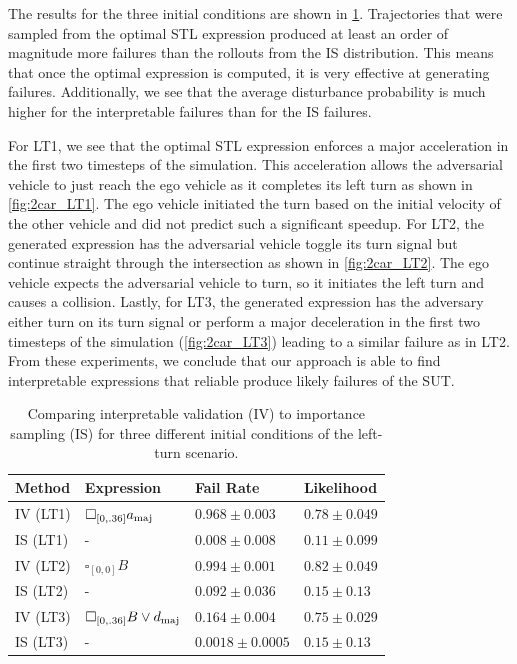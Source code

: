 The results for the three initial conditions are shown in \cref{tab:2car_results}. Trajectories that were sampled from the optimal STL expression produced at least an order of magnitude more failures than the rollouts from the IS distribution. This means that once the optimal expression is computed, it is very effective at generating failures. Additionally, we see that the average disturbance probability is much higher for the interpretable failures than for the IS failures. 

For LT1, we see that the optimal STL expression enforces a major acceleration in the first two timesteps of the simulation. This acceleration allows the adversarial vehicle to just reach the ego vehicle as it completes its left turn as shown in \cref{fig:2car_LT1}. The ego vehicle initiated the turn based on the initial velocity of the other vehicle and did not predict such a significant speedup. For LT2, the generated expression has the adversarial vehicle toggle its turn signal but continue straight through the intersection as shown in \cref{fig:2car_LT2}. The ego vehicle expects the adversarial vehicle to turn, so it initiates the left turn and causes a collision. Lastly, for LT3, the generated expression has the adversary either turn on its turn signal or perform a major deceleration in the first two timesteps of the simulation (\cref{fig:2car_LT3}) leading to a similar failure as in LT2. From these experiments, we conclude that our approach is able to find interpretable expressions that reliable produce likely failures of the SUT.

\begin{table}
    \centering
    \caption{Comparing interpretable validation (IV) to importance sampling (IS) for three different initial conditions of the left-turn scenario.}
    \label{tab:2car_results}
    \begin{tabular}{@{}llll@{}} 
        \toprule
        \textbf{Method} & \textbf{Expression} & \textbf{Fail Rate} & \textbf{Likelihood} \\
        \midrule
        IV (LT1) & $\square_{[0, .36]} a_{\rm maj}$ & $0.968 \pm 0.003$ & $0.78 \pm 0.049$ \\
        IS (LT1) & - &$0.008 \pm 0.008$ & $0.11 \pm 0.099$ \\
        \midrule
        IV (LT2) & $\square_{[0, 0]} B$ & $0.994 \pm 0.001$ & $0.82 \pm 0.049$ \\
        IS (LT2) & - & $0.092 \pm 0.036$ & $0.15 \pm 0.13$ \\
        \midrule
        IV (LT3) & $\square_{[0, .36]} B \lor d_{\rm maj}$ & $0.164 \pm 0.004$ & $0.75 \pm 0.029$ \\
        IS (LT3) & - & $0.0018 \pm 0.0005$ & $0.15 \pm 0.13$  \\
        \bottomrule
    \end{tabular}
\end{table}


